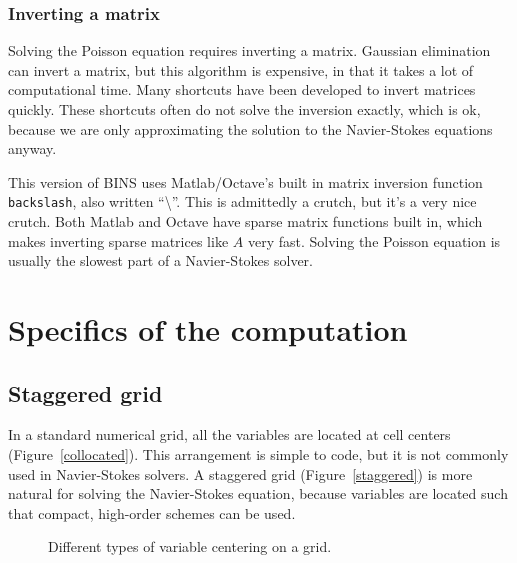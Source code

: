 \documentclass[12pt]{article}
\begin{document}
\subsubsection{Inverting a matrix}
Solving the Poisson equation requires inverting a matrix.  Gaussian elimination can invert a matrix, but this algorithm is expensive, in that it takes a lot of computational time.  Many shortcuts have been developed to invert matrices quickly.  These shortcuts often do not solve the inversion exactly, which is ok, because we are only approximating the solution to the Navier-Stokes equations anyway.

This version of BINS uses Matlab/Octave's built in matrix inversion function \texttt{backslash}, also written ``\textbackslash''.  This is admittedly a crutch, but it's a very nice crutch.  Both Matlab and Octave have sparse matrix functions built in, which makes inverting sparse matrices like $A$ very fast.  Solving the Poisson equation is usually the slowest part of a Navier-Stokes solver.

\section{Specifics of the computation}
\FloatBarrier
\subsection{Staggered grid}
\label{staggeredGrid}
In a standard numerical grid, all the variables are located at cell centers (Figure~\ref{collocated}).  This arrangement is simple to code, but it is not commonly used in Navier-Stokes solvers.  A staggered grid (Figure~\ref{staggered}) is more natural for solving the Navier-Stokes equation, because variables are located such that compact, high-order schemes can be used.

\begin{center}
\begin{figure*}[h]
\center
{}  
\caption{Different types of variable centering on a grid.}
\label{grid_types}
\end{figure*}
\end{center}
\end{document}
